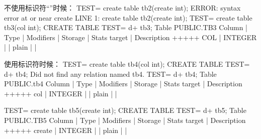 \documentclass[letterpaper,10pt,english]{sphinxmanual}
\begin{document}
\begin{sphinxVerbatim}[commandchars=\\\{\}]
不使用标识符“”时候：
TEST=\PYGZsh{} create table tb2(create int);
ERROR:  syntax error at or near \PYGZdq{}create\PYGZdq{}
LINE 1: create table tb2(create int);
                         \PYGZca{}
TEST=\PYGZsh{} create table tb3(col int);
CREATE TABLE
TEST=\PYGZsh{} \PYGZbs{}d+ tb3;
                         Table \PYGZdq{}PUBLIC.TB3\PYGZdq{}
 Column |  Type   | Modifiers | Storage | Stats target | Description
\PYGZhy{}\PYGZhy{}\PYGZhy{}\PYGZhy{}\PYGZhy{}\PYGZhy{}\PYGZhy{}\PYGZhy{}+\PYGZhy{}\PYGZhy{}\PYGZhy{}\PYGZhy{}\PYGZhy{}\PYGZhy{}\PYGZhy{}\PYGZhy{}\PYGZhy{}+\PYGZhy{}\PYGZhy{}\PYGZhy{}\PYGZhy{}\PYGZhy{}\PYGZhy{}\PYGZhy{}\PYGZhy{}\PYGZhy{}\PYGZhy{}\PYGZhy{}+\PYGZhy{}\PYGZhy{}\PYGZhy{}\PYGZhy{}\PYGZhy{}\PYGZhy{}\PYGZhy{}\PYGZhy{}\PYGZhy{}+\PYGZhy{}\PYGZhy{}\PYGZhy{}\PYGZhy{}\PYGZhy{}\PYGZhy{}\PYGZhy{}\PYGZhy{}\PYGZhy{}\PYGZhy{}\PYGZhy{}\PYGZhy{}\PYGZhy{}\PYGZhy{}+\PYGZhy{}\PYGZhy{}\PYGZhy{}\PYGZhy{}\PYGZhy{}\PYGZhy{}\PYGZhy{}\PYGZhy{}\PYGZhy{}\PYGZhy{}\PYGZhy{}\PYGZhy{}\PYGZhy{}
 COL    | INTEGER |           | plain   |              |

使用标识符时候：
TEST=\PYGZsh{} create table \PYGZdq{}tb4\PYGZdq{}(\PYGZdq{}col\PYGZdq{} int);
CREATE TABLE
TEST=\PYGZsh{} \PYGZbs{}d+ tb4;
Did not find any relation named \PYGZdq{}tb4\PYGZdq{}.
TEST=\PYGZsh{} \PYGZbs{}d+ \PYGZdq{}tb4\PYGZdq{};
                         Table \PYGZdq{}PUBLIC.tb4\PYGZdq{}
 Column |  Type   | Modifiers | Storage | Stats target | Description
\PYGZhy{}\PYGZhy{}\PYGZhy{}\PYGZhy{}\PYGZhy{}\PYGZhy{}\PYGZhy{}\PYGZhy{}+\PYGZhy{}\PYGZhy{}\PYGZhy{}\PYGZhy{}\PYGZhy{}\PYGZhy{}\PYGZhy{}\PYGZhy{}\PYGZhy{}+\PYGZhy{}\PYGZhy{}\PYGZhy{}\PYGZhy{}\PYGZhy{}\PYGZhy{}\PYGZhy{}\PYGZhy{}\PYGZhy{}\PYGZhy{}\PYGZhy{}+\PYGZhy{}\PYGZhy{}\PYGZhy{}\PYGZhy{}\PYGZhy{}\PYGZhy{}\PYGZhy{}\PYGZhy{}\PYGZhy{}+\PYGZhy{}\PYGZhy{}\PYGZhy{}\PYGZhy{}\PYGZhy{}\PYGZhy{}\PYGZhy{}\PYGZhy{}\PYGZhy{}\PYGZhy{}\PYGZhy{}\PYGZhy{}\PYGZhy{}\PYGZhy{}+\PYGZhy{}\PYGZhy{}\PYGZhy{}\PYGZhy{}\PYGZhy{}\PYGZhy{}\PYGZhy{}\PYGZhy{}\PYGZhy{}\PYGZhy{}\PYGZhy{}\PYGZhy{}\PYGZhy{}
 col    | INTEGER |           | plain   |              |

TEST=\PYGZsh{} create table tb5(\PYGZdq{}create\PYGZdq{} int);
CREATE TABLE
TEST=\PYGZsh{} \PYGZbs{}d+ tb5;
                         Table \PYGZdq{}PUBLIC.TB5\PYGZdq{}
 Column |  Type   | Modifiers | Storage | Stats target | Description
\PYGZhy{}\PYGZhy{}\PYGZhy{}\PYGZhy{}\PYGZhy{}\PYGZhy{}\PYGZhy{}\PYGZhy{}+\PYGZhy{}\PYGZhy{}\PYGZhy{}\PYGZhy{}\PYGZhy{}\PYGZhy{}\PYGZhy{}\PYGZhy{}\PYGZhy{}+\PYGZhy{}\PYGZhy{}\PYGZhy{}\PYGZhy{}\PYGZhy{}\PYGZhy{}\PYGZhy{}\PYGZhy{}\PYGZhy{}\PYGZhy{}\PYGZhy{}+\PYGZhy{}\PYGZhy{}\PYGZhy{}\PYGZhy{}\PYGZhy{}\PYGZhy{}\PYGZhy{}\PYGZhy{}\PYGZhy{}+\PYGZhy{}\PYGZhy{}\PYGZhy{}\PYGZhy{}\PYGZhy{}\PYGZhy{}\PYGZhy{}\PYGZhy{}\PYGZhy{}\PYGZhy{}\PYGZhy{}\PYGZhy{}\PYGZhy{}\PYGZhy{}+\PYGZhy{}\PYGZhy{}\PYGZhy{}\PYGZhy{}\PYGZhy{}\PYGZhy{}\PYGZhy{}\PYGZhy{}\PYGZhy{}\PYGZhy{}\PYGZhy{}\PYGZhy{}\PYGZhy{}
 create | INTEGER |           | plain   |              |
\end{sphinxVerbatim}
\end{document}

